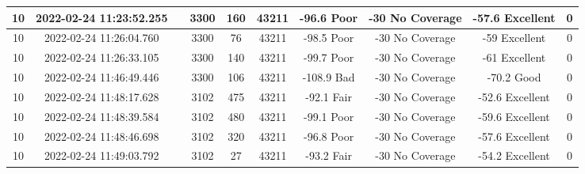 \begin{longtable*}{|c|c|c|c|c|c|c|c|c|c|}
10&2022-02-24 11:23:52.255&&3300&160&43211& -96.6     Poor        & -30       No Coverage & -57.6     Excellent   & 0\\\hline
{}10&2022-02-24 11:26:04.760&&3300&76&43211& -98.5     Poor        & -30       No Coverage & -59       Excellent   & 0\\\hline
{}10&2022-02-24 11:26:33.105&&3300&140&43211& -99.7     Poor        & -30       No Coverage & -61       Excellent   & 0\\\hline
{}10&2022-02-24 11:46:49.446&&3300&106&43211& -108.9    Bad         & -30       No Coverage & -70.2     Good        & 0\\\hline
{}10&2022-02-24 11:48:17.628&&3102&475&43211& -92.1     Fair        & -30       No Coverage & -52.6     Excellent   & 0\\\hline
{}10&2022-02-24 11:48:39.584&&3102&480&43211& -99.1     Poor        & -30       No Coverage & -59.6     Excellent   & 0\\\hline
{}10&2022-02-24 11:48:46.698&&3102&320&43211& -96.8     Poor        & -30       No Coverage & -57.6     Excellent   & 0\\\hline
{}10&2022-02-24 11:49:03.792&&3102&27&43211& -93.2     Fair        & -30       No Coverage & -54.2     Excellent   & 0\\\hline

\end{longtable*}
